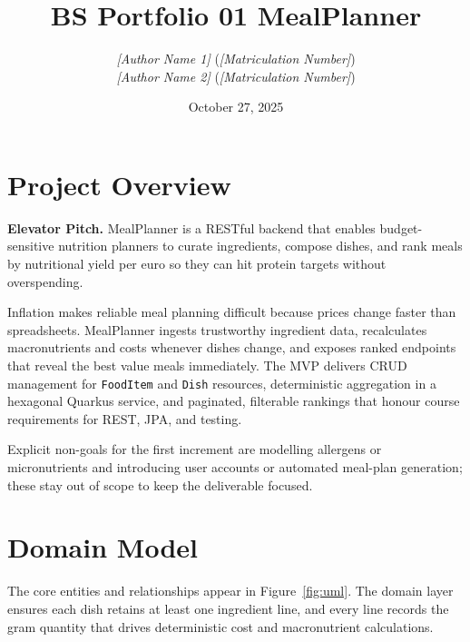 \documentclass[11pt]{article}
\title{BS Portfolio 01 MealPlanner}
\author{
  \textit{[Author Name 1]} (\textit{[Matriculation Number]})\\
  \textit{[Author Name 2]} (\textit{[Matriculation Number]})
}
\date{October 27, 2025}
\begin{document}
\maketitle

\section{Project Overview}

\textbf{Elevator Pitch.} MealPlanner is a RESTful backend that enables budget-sensitive nutrition planners to curate ingredients, compose dishes, and rank meals by nutritional yield per euro so they can hit protein targets without overspending.

Inflation makes reliable meal planning difficult because prices change faster than spreadsheets. MealPlanner ingests trustworthy ingredient data, recalculates macronutrients and costs whenever dishes change, and exposes ranked endpoints that reveal the best value meals immediately. The MVP delivers CRUD management for \texttt{FoodItem} and \texttt{Dish} resources, deterministic aggregation in a hexagonal Quarkus service, and paginated, filterable rankings that honour course requirements for REST, JPA, and testing.

Explicit non-goals for the first increment are modelling allergens or micronutrients and introducing user accounts or automated meal-plan generation; these stay out of scope to keep the deliverable focused.

\section{Domain Model}

The core entities and relationships appear in Figure~\ref{fig:uml}. The domain layer ensures each dish retains at least one ingredient line, and every line records the gram quantity that drives deterministic cost and macronutrient calculations.
\end{document}
